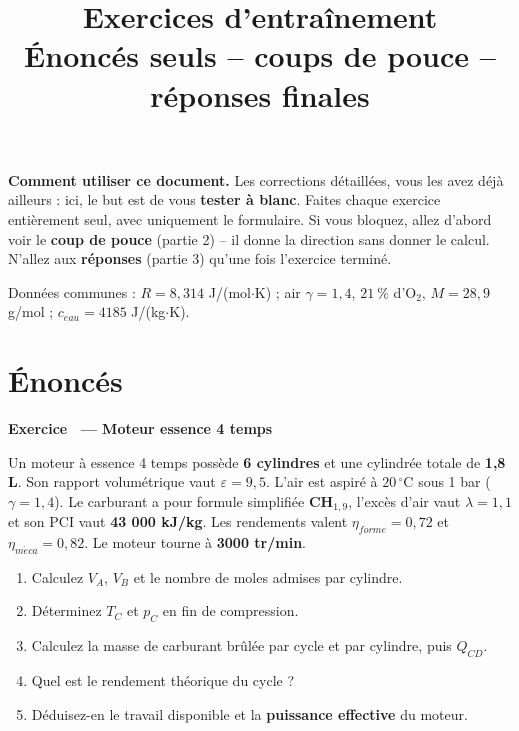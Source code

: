 \documentclass[11pt,a4paper]{article}
\title{\textbf{Exercices d'entraînement}\\[3pt]
\large Énoncés seuls -- coups de pouce -- réponses finales}
\author{}
\date{}
\newcounter{exo}
\newcommand{\exo}[1]{\refstepcounter{exo}\par\medskip\noindent
{\color{cbleu}\bfseries\large Exercice \theexo\ --- #1}\par\smallskip}
\begin{document}
\maketitle
\vspace{-0.8cm}

\begin{info}
\textbf{Comment utiliser ce document.} Les corrections détaillées, vous les avez déjà ailleurs : ici, le
but est de vous \textbf{tester à blanc}. Faites chaque exercice entièrement seul, avec uniquement le
formulaire. Si vous bloquez, allez d'abord voir le \textbf{coup de pouce} (partie 2) -- il donne la
direction sans donner le calcul. N'allez aux \textbf{réponses} (partie 3) qu'une fois l'exercice terminé.

\smallskip
Données communes : $R=8{,}314$ J/(mol$\cdot$K) ; air $\gamma=1{,}4$, $21\ \%$ d'O$_2$, $M=28{,}9$ g/mol ;
$c_{eau}=4185$ J/(kg$\cdot$K).
\end{info}

\section{Énoncés}

\exo{Moteur essence 4 temps}
\begin{ex}
Un moteur à essence 4 temps possède \textbf{6 cylindres} et une cylindrée totale de \textbf{1,8 L}. Son
rapport volumétrique vaut $\varepsilon=9{,}5$. L'air est aspiré à $20\,^\circ$C sous 1 bar
($\gamma=1{,}4$). Le carburant a pour formule simplifiée \textbf{CH$_{1,9}$}, l'excès d'air vaut
$\lambda=1{,}1$ et son PCI vaut \textbf{43 000 kJ/kg}. Les rendements valent $\eta_{forme}=0{,}72$ et
$\eta_{m\acute{e}ca}=0{,}82$. Le moteur tourne à \textbf{3000 tr/min}.

\begin{enumerate}[label=\alph*),leftmargin=1.6em,nosep]
\item Calculez $V_A$, $V_B$ et le nombre de moles admises par cylindre.
\item Déterminez $T_C$ et $p_C$ en fin de compression.
\item Calculez la masse de carburant brûlée par cycle et par cylindre, puis $Q_{CD}$.
\item Quel est le rendement théorique du cycle ?
\item Déduisez-en le travail disponible et la \textbf{puissance effective} du moteur.
\end{enumerate}
\end{ex}
\end{document}
